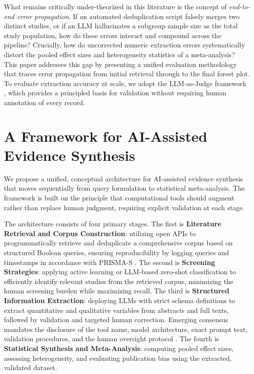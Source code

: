 \documentclass[12pt]{article}
\begin{document}
What remains critically under-theorized in this literature is the concept of \textit{end-to-end error propagation}. If an automated deduplication script falsely merges two distinct studies, or if an LLM hallucinates a subgroup sample size as the total study population, how do these errors interact and compound across the pipeline? Crucially, how do uncorrected numeric extraction errors systematically distort the pooled effect sizes and heterogeneity statistics of a meta-analysis? This paper addresses this gap by presenting a unified evaluation methodology that traces error propagation from initial retrieval through to the final forest plot. To evaluate extraction accuracy at scale, we adopt the LLM-as-Judge framework \citep{zheng2024llmjudge}, which provides a principled basis for validation without requiring human annotation of every record.

\section{A Framework for AI-Assisted Evidence Synthesis}

We propose a unified, conceptual architecture for AI-assisted evidence synthesis that moves sequentially from query formulation to statistical meta-analysis. The framework is built on the principle that computational tools should augment rather than replace human judgment, requiring explicit validation at each stage.

The architecture consists of four primary stages. The first is \textbf{Literature Retrieval and Corpus Construction}: utilizing open APIs to programmatically retrieve and deduplicate a comprehensive corpus based on structured Boolean queries, ensuring reproducibility by logging queries and timestamps in accordance with PRISMA-S \citep{rethlefsen2021prismas}. The second is \textbf{Screening Strategies}: applying active learning \citep{vandeschoot2021asreview} or LLM-based zero-shot classification to efficiently identify relevant studies from the retrieved corpus, minimizing the human screening burden while maximizing recall. The third is \textbf{Structured Information Extraction}: deploying LLMs with strict schema definitions to extract quantitative and qualitative variables from abstracts and full texts, followed by validation and targeted human correction. Emerging consensus mandates the disclosure of the tool name, model architecture, exact prompt text, validation procedures, and the human oversight protocol \citep{flemyng2025ai}. The fourth is \textbf{Statistical Synthesis and Meta-Analysis}: computing pooled effect sizes, assessing heterogeneity, and evaluating publication bias using the extracted, validated dataset. 
\end{document}
